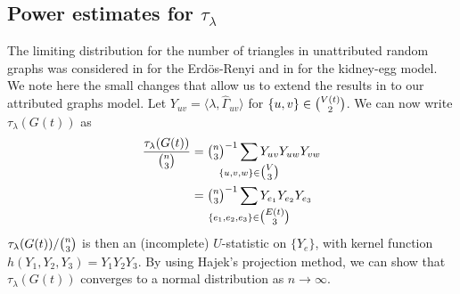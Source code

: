 \documentclass[final]{IEEEtran}
\theoremstyle{definition}
\def\clap#1{\hbox to 0pt{\hss#1\hss}}
\def\mathclap{\mathpalette\mathclapinternal}
\def\mathclapinternal#1#2{%
\clap{$\mathsurround=0pt#1{#2}$}%
}
\begin{document}
\subsection{Power estimates for $\tau_{\lambda}$}
\label{sec:power-estim-tau_l}
The limiting distribution for the number of triangles in unattributed
random graphs was considered in
\cite{nowicki88:_subgr_u_statis_method} for the Erd\"{o}s-Renyi 
and in \cite{rukhin09:_asymp_analy_various_statis_random_graph_infer}
for the kidney-egg model. We note here the small changes that allow us
to extend the results in
\cite{rukhin09:_asymp_analy_various_statis_random_graph_infer,%
nowicki88:_subgr_u_statis_method}
to our attributed graphs model. Let $Y_{uv} = \langle \lambda,
\widehat{\Gamma}_{uv} \rangle$ for $\{u,v\} \in \tbinom{V(t)}{2}$. We
can now write $\tau_{\lambda}(G(t))$ as
\begin{equation}
  \label{eq:45}
  \begin{split}
  \frac{\tau_{\lambda}(G(t))}{\tbinom{n}{3}} &= \tbinom{n}{3}^{-1}
  \sum_{\mathclap{\{u,v,w\} \in \tbinom{V}{3}}} Y_{uv} Y_{uw} Y_{vw}
  \\ &= \tbinom{n}{3}^{-1}
  \sum_{\mathclap{\{e_1, e_2, e_3\} \in \tbinom{E(t)}{3}}} Y_{e_1}
  Y_{e_2} Y_{e_3}
  \end{split}
\end{equation}
$\tau_{\lambda}(G(t))/\tbinom{n}{3}$ is then an (incomplete)
$U$-statistic on $\{Y_{e}\}$, with kernel function $h(Y_{1}, Y_{2},
Y_{3}) = Y_{1} Y_{2} Y_{3}$. By using Hajek's projection method, we
can show that $\tau_{\lambda}(G(t))$ converges to a normal
distribution as $n \rightarrow \infty$. 
\end{document}
